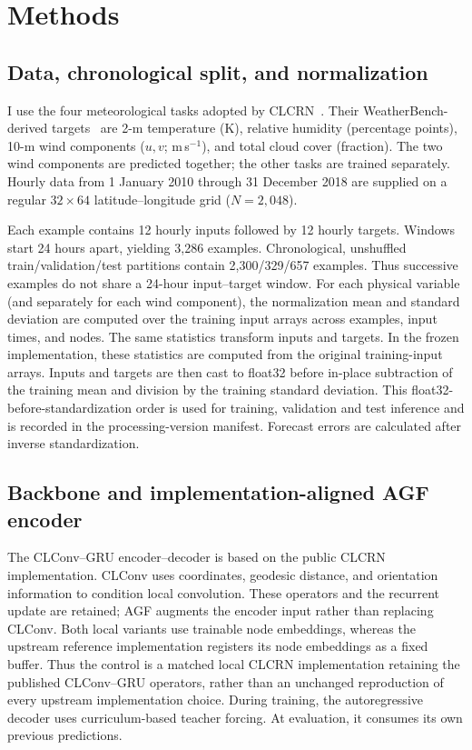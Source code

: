 \documentclass[fleqn,10pt]{wlscirep}
\begin{document}
\FloatBarrier

\section{Methods}\label{sec:methods}
\subsection{Data, chronological split, and normalization}\label{sec:data}
I use the four meteorological tasks adopted by CLCRN~\cite{lin2022conditional}.
Their WeatherBench-derived targets~\cite{rasp2020weatherbench} are 2-m temperature (K),
relative humidity (percentage points), 10-m wind components ($u,v$;
m\,s$^{-1}$), and total cloud cover (fraction). The two wind components are
predicted together; the other tasks are trained separately. Hourly data
from 1 January 2010 through 31 December 2018 are supplied on a regular
$32\times64$ latitude--longitude grid ($N=2{,}048$).

Each example contains 12 hourly inputs followed by 12 hourly targets.
Windows start 24 hours apart, yielding 3,286 examples. Chronological,
unshuffled train/validation/test partitions contain 2,300/329/657 examples.
Thus successive examples do not share a 24-hour input--target window.
For each physical variable (and separately for each wind component), the
normalization mean and standard deviation are computed over the training
input arrays across examples, input times, and nodes. The same statistics
transform inputs and targets. In the frozen implementation, these statistics are computed from the original training-input arrays. Inputs and targets are then cast to float32 before in-place subtraction of the training mean and division by the training standard deviation. This float32-before-standardization order is used for training, validation and test inference and is recorded in the processing-version manifest. Forecast errors are calculated after inverse standardization.

\subsection{Backbone and implementation-aligned AGF encoder}\label{sec:architecture}
The CLConv--GRU encoder--decoder is based on the public CLCRN implementation.
CLConv uses coordinates, geodesic distance, and orientation information to
condition local convolution. These operators and the recurrent update are
retained; AGF augments the encoder input rather than replacing CLConv.
Both local variants use trainable node embeddings, whereas the upstream
reference implementation registers its node embeddings as a fixed buffer.
Thus the control is a matched local CLCRN implementation retaining the
published CLConv--GRU operators, rather than an unchanged reproduction
of every upstream implementation choice.
During training, the autoregressive decoder uses curriculum-based teacher
forcing. At evaluation, it consumes its own previous predictions.
\end{document}
